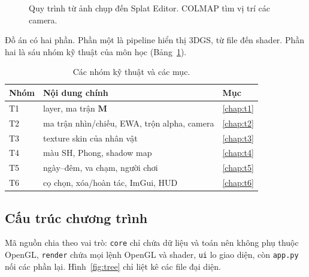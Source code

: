 \documentclass[9pt,twocolumn,a4paper]{extarticle}
\newcommand{\code}[1]{\texttt{#1}}
\begin{document}
\begin{figure}[H]
\centering
{}
\caption{Quy trình từ ảnh chụp đến Splat Editor. COLMAP \cite{schonberger2016colmap} tìm vị trí các camera.}
\label{fig:pipeline}
\end{figure}

Đồ án có hai phần. Phần một là pipeline hiển thị 3DGS, từ file đến shader. Phần hai là sáu nhóm kỹ thuật của môn học (Bảng~\ref{tab:map}).

\begin{table}[H]
\centering
\caption{Các nhóm kỹ thuật và các mục.}
\label{tab:map}
\footnotesize
\begin{tabular}{@{}lll@{}}
\toprule
Nhóm & Nội dung chính & Mục \\
\midrule
T1 & layer, ma trận $\mathbf{M}$ & \ref{chap:t1} \\
T2 & ma trận nhìn/chiếu, EWA, trộn alpha, camera & \ref{chap:t2} \\
T3 & texture skin của nhân vật & \ref{chap:t3} \\
T4 & màu SH, Phong, shadow map & \ref{chap:t4} \\
T5 & ngày--đêm, va chạm, người chơi & \ref{chap:t5} \\
T6 & cọ chọn, xóa/hoàn tác, ImGui, HUD & \ref{chap:t6} \\
\bottomrule
\end{tabular}
\end{table}

\subsection{Cấu trúc chương trình}
Mã nguồn chia theo vai trò: \code{core} chỉ chứa dữ liệu và toán nên không phụ thuộc OpenGL, \code{render} chứa mọi lệnh OpenGL và shader, \code{ui} lo giao diện, còn \code{app.py} nối các phần lại. Hình~\ref{fig:tree} chỉ liệt kê các file đại diện.
\end{document}
